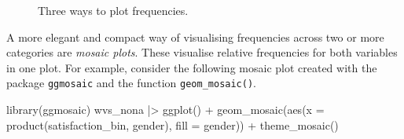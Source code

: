 \documentclass[
  letterpaper,
  DIV=11,
  numbers=noendperiod]{scrreprt}
\newenvironment{Shaded}{\begin{snugshade}}{\end{snugshade}}
\newcommand{\AttributeTok}[1]{\textcolor[rgb]{0.40,0.45,0.13}{#1}}
\newcommand{\FunctionTok}[1]{\textcolor[rgb]{0.28,0.35,0.67}{#1}}
\newcommand{\NormalTok}[1]{\textcolor[rgb]{0.00,0.23,0.31}{#1}}
\newcommand{\SpecialCharTok}[1]{\textcolor[rgb]{0.37,0.37,0.37}{#1}}
\begin{document}
\begin{figure}[H]


\caption{\label{fig-three-plots-satisfaction-gender}Three ways to plot
frequencies.}

\end{figure}%

A more elegant and compact way of visualising frequencies across two or
more categories are \emph{mosaic plots}. These visualise relative
frequencies for both variables in one plot. For example, consider the
following mosaic plot created with the package \texttt{ggmosaic} and the
function \texttt{geom\_mosaic()}.

\begin{Shaded}
\begin{Highlighting}[]
\FunctionTok{library}\NormalTok{(ggmosaic)}
\NormalTok{wvs\_nona }\SpecialCharTok{|\textgreater{}}
  \FunctionTok{ggplot}\NormalTok{() }\SpecialCharTok{+}
  \FunctionTok{geom\_mosaic}\NormalTok{(}\FunctionTok{aes}\NormalTok{(}\AttributeTok{x =} \FunctionTok{product}\NormalTok{(satisfaction\_bin, gender),}
                            \AttributeTok{fill =}\NormalTok{ gender)) }\SpecialCharTok{+}
  \FunctionTok{theme\_mosaic}\NormalTok{()}
\end{Highlighting}
\end{Shaded}
\end{document}
